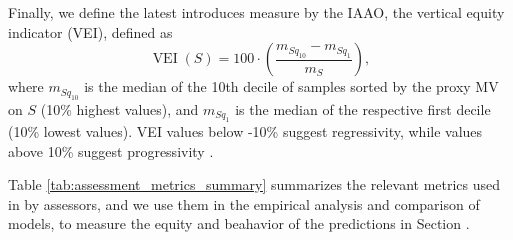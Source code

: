 \documentclass[12pt, draft]{article}
\theoremstyle{plain}
\theoremstyle{definition}
\newcommand{\1}{\mathbf{1}}
\begin{document}
Finally, we define the latest introduces measure by the IAAO, the vertical equity indicator (VEI), defined as 
\begin{equation}
\operatorname{VEI}(S)=100\cdot \left(\frac{m_{S{q_\text{10}}} - m_{S{q_\text{1}}}}{m_S}\right),
\end{equation}
where $m_{S{q_\text{10}}}$ is the median of the 10th decile of samples sorted by the proxy MV on $S$ (10\% highest values), and $m_{S{q_\text{1}}}$ is the median of the respective first decile (10\% lowest values). VEI values below -10\% suggest regressivity, while values above 10\% suggest progressivity \cite{IAAO2025ExposureRatio}.

Table \ref{tab:assessment_metrics_summary} summarizes the relevant metrics used in by assessors, and we use them in the empirical analysis and comparison of models, to measure the equity and beahavior of the predictions in Section .
\end{document}
